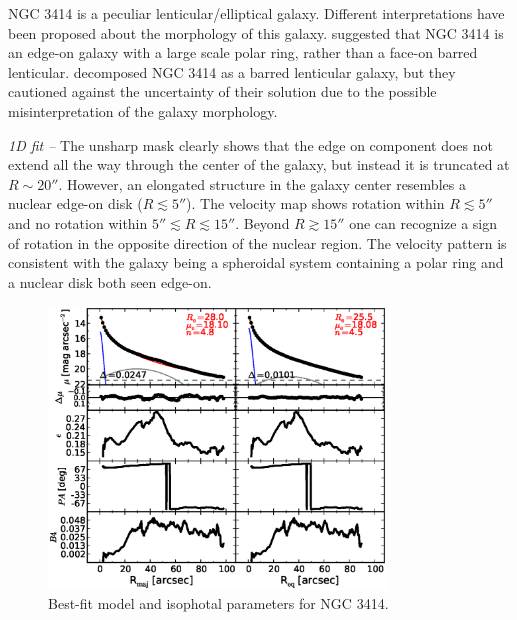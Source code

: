 \documentclass[preprint2]{emulateapj}
\newcommand{\fitfigurewidth}{0.8\textwidth}
\begin{document}
  NGC 3414 is a peculiar lenticular/elliptical galaxy. 
  Different interpretations have been proposed about the morphology of this galaxy.
  \cite{whitmore1990} suggested that NGC 3414 is an edge-on galaxy 
  with a large scale polar ring, rather than a face-on barred lenticular.
  \cite{laurikainen2010} decomposed NGC 3414 as a barred lenticular galaxy, but 
  they cautioned against the uncertainty of their solution due to the possible misinterpretation of the 
  galaxy morphology.

  \emph{1D fit -- }
  The unsharp mask clearly shows that the edge on component does not extend all the way through the 
  center of the galaxy, but instead it is truncated at $R \sim 20''$.
  However, an elongated structure in the galaxy center resembles a nuclear edge-on disk ($R \lesssim 5''$).
  The velocity map shows rotation within $R \lesssim 5''$ and no rotation within $5'' \lesssim R \lesssim 15''$.
  Beyond $R \gtrsim 15''$ one can recognize a sign of rotation in the opposite direction of the nuclear region.
  The velocity pattern is consistent with the galaxy being a spheroidal system containing a polar ring and a nuclear disk
  both seen edge-on.

  \begin{figure}[h]
  \begin{center}
  \includegraphics[width=\fitfigurewidth]{images/n3414_1Dfit.eps}
  \caption{Best-fit model and isophotal parameters for NGC 3414.}
  \end{center}
  \end{figure}
\end{document}
